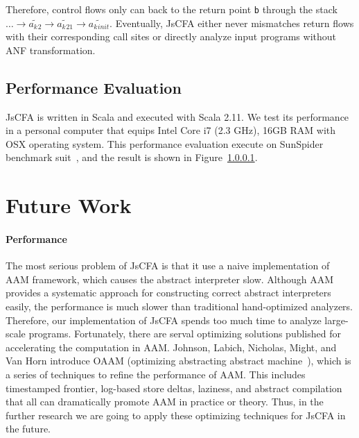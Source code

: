 \documentclass{article}
\begin{document}
Therefore, control flows only can back to the return point \verb|b| through the stack $\dots \to \widetilde{a_k{}_{2}} \to \widetilde{a_k{}_{21}} \to \widetilde{a_k{}_{init}}$. Eventually, JsCFA either never mismatches return flows with their corresponding call sites or directly analyze input programs without ANF transformation.

\subsection{Performance Evaluation}
\label{sub:Performance Evaluation}
JsCFA is written in Scala and executed with Scala 2.11.
We test its performance in a personal computer that equips Intel Core i7 (2.3 GHz), 16GB RAM with OSX operating system.
This performance evaluation execute on SunSpider benchmark suit~\cite{sunspider}, and the result is shown in Figure~\ref{}.

\section{Future Work}
\label{sec:Future}
\paragraph{Performance}
The most serious problem of JsCFA is that it use a naive implementation of AAM framework, which causes the abstract interpreter slow.
Although AAM provides a systematic approach for constructing correct abstract interpreters easily, the performance is much slower than traditional hand-optimized analyzers.
Therefore, our implementation of JsCFA spends too much time to analyze large-scale programs.
Fortunately, there are serval optimizing solutions published for accelerating the computation in AAM\@.
Johnson, Labich, Nicholas, Might, and Van Horn introduce OAAM (optimizing abstracting abstract machine~\cite{johnson2013optimizing}), which is a series of techniques to refine the performance of AAM\@.
This includes timestamped frontier, log-based store deltas, laziness, and abstract compilation that all can dramatically promote AAM in practice or theory.
Thus, in the further research we are going to apply these optimizing techniques for JsCFA in the future.
\end{document}
